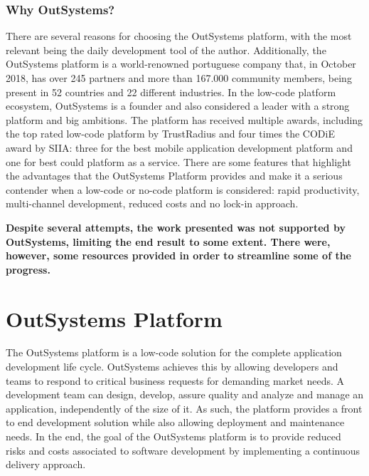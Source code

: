 \documentclass{sigchi}
\begin{document}
\subsubsection{Why OutSystems?}
There are several reasons for choosing the OutSystems platform, with the most relevant being the daily development tool of the author. Additionally, the OutSystems platform is a world-renowned portuguese company that, in October 2018, has over 245 partners and more than 167.000 community members, being present in 52 countries and 22 different industries. In the low-code platform ecosystem, OutSystems is a founder and also considered a leader with a strong platform and big ambitions. The platform has received multiple awards, including the top rated low-code platform by TrustRadius and four times the CODiE award by SIIA: three for the best mobile application development platform and one for best could platform as a service. There are some features that highlight the advantages that the OutSystems Platform provides and make it a serious contender when a low-code or no-code platform is considered: rapid productivity, multi-channel development, reduced costs and no lock-in approach.

\textbf{Despite several attempts, the work presented was not supported by OutSystems, limiting the end result to some extent. There were, however, some resources provided in order to streamline some of the progress.}

\section{OutSystems Platform}
The OutSystems platform is a low-code solution for the complete application development life cycle. OutSystems achieves this by allowing developers and teams to respond to critical business requests for demanding market needs. A development team can design, develop, assure quality and analyze and manage an application, independently of the size of it. As such, the platform provides a front to end development solution while also allowing deployment and maintenance needs. In the end, the goal of the OutSystems platform is to provide reduced risks and costs associated to software development by implementing a continuous delivery approach.
\end{document}
